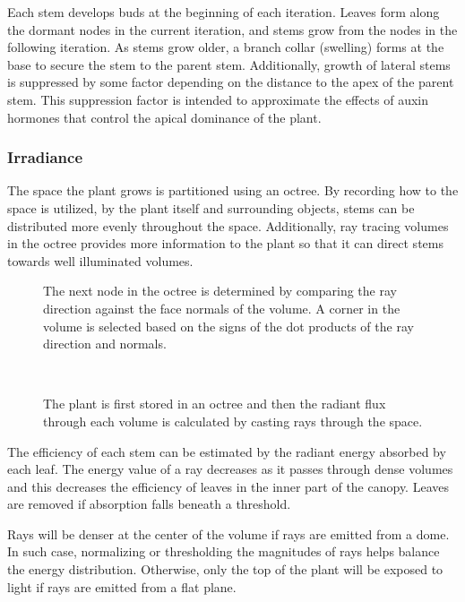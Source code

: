 \documentclass[10pt]{article}
\begin{document}
Each stem develops buds at the beginning of each iteration. Leaves form along the dormant nodes in the current iteration, and stems grow from the nodes in the following iteration. As stems grow older, a branch collar (swelling) forms at the base to secure the stem to the parent stem. Additionally, growth of lateral stems is suppressed by some factor depending on the distance to the apex of the parent stem. This suppression factor is intended to approximate the effects of auxin hormones that control the apical dominance of the plant.

\subsubsection{Irradiance}
The space the plant grows is partitioned using an octree. By recording how to the space is utilized, by the plant itself and surrounding objects, stems can be distributed more evenly throughout the space. Additionally, ray tracing volumes in the octree provides more information to the plant so that it can direct stems towards well illuminated volumes.

\begin{figure}[H]
 \begin{minipage}[H]{0.48\textwidth}
  \centering
  
  \caption{The next node in the octree is determined by comparing the ray direction against the face normals of the volume. A corner in the volume is selected based on the signs of the dot products of the ray direction and normals.}
 \end{minipage}
 \hfill
 \begin{minipage}[H]{0.48\textwidth}
  \centering
   \\
  \caption{The plant is first stored in an octree and then the radiant flux through each volume is calculated by casting rays through the space.}
 \end{minipage}
\end{figure}

The efficiency of each stem can be estimated by the radiant energy absorbed by each leaf. The energy value of a ray decreases as it passes through dense volumes and this decreases the efficiency of leaves in the inner part of the canopy. Leaves are removed if absorption falls beneath a threshold.

Rays will be denser at the center of the volume if rays are emitted from a dome. In such case, normalizing or thresholding the magnitudes of rays helps balance the energy distribution. Otherwise, only the top of the plant will be exposed to light if rays are emitted from a flat plane.
\end{document}
